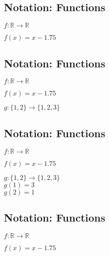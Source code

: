 \documentclass[twocolumn,20pt,fleqn]{extarticle}
\newcommand{\sep}{\vspace{0.5cm}}
\theoremstyle{plain}
\theoremstyle{definition}
\theoremstyle{remark}
\begin{document}
\clearpage




\subsection{Notation: Functions}

$ f: \mathbb{R}  \to \mathbb{R}$

$f(x) = x - 1.75$\\




\clearpage




\subsection{Notation: Functions}

$ f: \mathbb{R}  \to \mathbb{R}$

$f(x) = x - 1.75$\\

\sep

  $g : \{1,2\} \to \{1,2,3\}$\\


\clearpage




\subsection{Notation: Functions}

$ f: \mathbb{R}  \to \mathbb{R}$

$f(x) = x - 1.75$\\

\sep

  $g : \{1,2\} \to \{1,2,3\}$\\
    $g(1) = 3$\\
    $g(2) = 1$\\

\sep




\clearpage




\subsection{Notation: Functions}

$ f: \mathbb{R}  \to \mathbb{R}$

$f(x) = x - 1.75$\\

\sep
\end{document}

